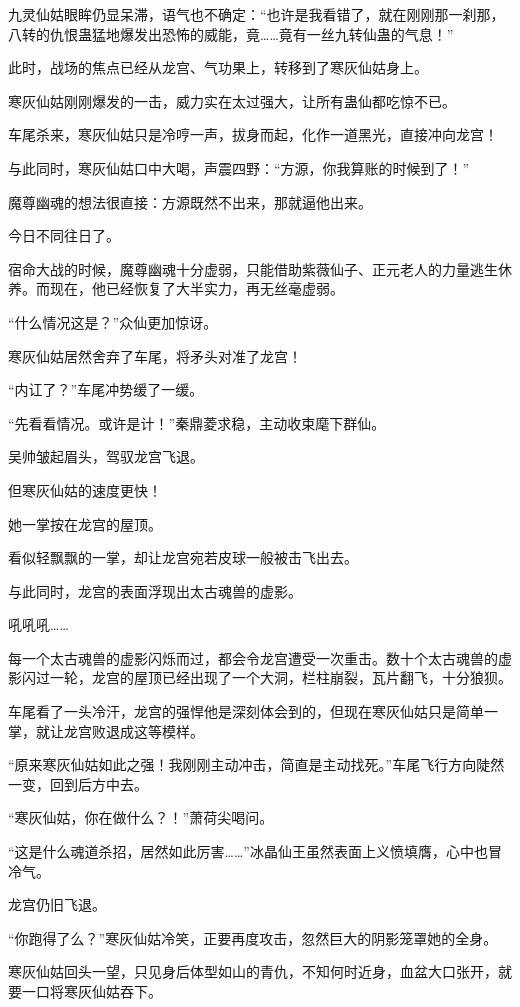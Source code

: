 \begin{this_body}
九灵仙姑眼眸仍显呆滞，语气也不确定：“也许是我看错了，就在刚刚那一刹那，八转的仇恨蛊猛地爆发出恐怖的威能，竟……竟有一丝九转仙蛊的气息！”

此时，战场的焦点已经从龙宫、气功果上，转移到了寒灰仙姑身上。

寒灰仙姑刚刚爆发的一击，威力实在太过强大，让所有蛊仙都吃惊不已。

车尾杀来，寒灰仙姑只是冷哼一声，拔身而起，化作一道黑光，直接冲向龙宫！

与此同时，寒灰仙姑口中大喝，声震四野：“方源，你我算账的时候到了！”

魔尊幽魂的想法很直接：方源既然不出来，那就逼他出来。

今日不同往日了。

宿命大战的时候，魔尊幽魂十分虚弱，只能借助紫薇仙子、正元老人的力量逃生休养。而现在，他已经恢复了大半实力，再无丝毫虚弱。

“什么情况这是？”众仙更加惊讶。

寒灰仙姑居然舍弃了车尾，将矛头对准了龙宫！

“内讧了？”车尾冲势缓了一缓。

“先看看情况。或许是计！”秦鼎菱求稳，主动收束麾下群仙。

吴帅皱起眉头，驾驭龙宫飞退。

但寒灰仙姑的速度更快！

她一掌按在龙宫的屋顶。

看似轻飘飘的一掌，却让龙宫宛若皮球一般被击飞出去。

与此同时，龙宫的表面浮现出太古魂兽的虚影。

吼吼吼……

每一个太古魂兽的虚影闪烁而过，都会令龙宫遭受一次重击。数十个太古魂兽的虚影闪过一轮，龙宫的屋顶已经出现了一个大洞，栏柱崩裂，瓦片翻飞，十分狼狈。

车尾看了一头冷汗，龙宫的强悍他是深刻体会到的，但现在寒灰仙姑只是简单一掌，就让龙宫败退成这等模样。

“原来寒灰仙姑如此之强！我刚刚主动冲击，简直是主动找死。”车尾飞行方向陡然一变，回到后方中去。

“寒灰仙姑，你在做什么？！”萧荷尖喝问。

“这是什么魂道杀招，居然如此厉害……”冰晶仙王虽然表面上义愤填膺，心中也冒冷气。

龙宫仍旧飞退。

“你跑得了么？”寒灰仙姑冷笑，正要再度攻击，忽然巨大的阴影笼罩她的全身。

寒灰仙姑回头一望，只见身后体型如山的青仇，不知何时近身，血盆大口张开，就要一口将寒灰仙姑吞下。


\end{this_body}
